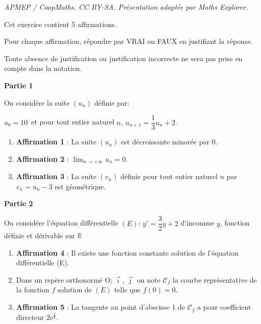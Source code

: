 \documentclass[10pt]{article}
\providecommand{\R}{\mathbb{R}}
\providecommand{\e}{{\mathrm{e}}}
\providecommand{\Oij}{\(\mathrm{O};\vec{\imath},\vec{\jmath}\)}
\begin{document}
\noindent\textit{APMEP / CoopMaths. CC BY-SA. Présentation adaptée par Maths Explorer.}\par\medskip
\medskip

Cet exercice contient 5 affirmations.

Pour chaque affirmation, répondre par VRAI ou FAUX en justifiant la réponse.

Toute absence de justification ou justification incorrecte ne sera pas prise en compte dans la notation.

\medskip

\textbf{Partie 1}

\medskip

On considère la suite $(u_n)$ définie par:

\begin{center}$u_0 = 10$\, et pour tout entier naturel $n,\,u_{n+1} = \dfrac13 u_n + 2$.\end{center}

\medskip

\begin{enumerate}
\item \textbf{Affirmation 1} : La suite $(u_n)$ est décroissante minorée par 0.
\item \textbf{Affirmation 2} : $\displaystyle\lim_{n \to + \infty} u_n = 0$.
\item \textbf{Affirmation 3} : La suite $(v_n)$ définie pour tout entier naturel $n$ par $v_n = u_n - 3$ est géométrique.
\end{enumerate}

\medskip

\textbf{Partie 2}

\medskip

On considère l'équation différentielle $(E) :\, y' = \dfrac32 y + 2$ d'inconnue $y$, fonction définie et 
dérivable sur $\R$

\medskip

\begin{enumerate}
\item \textbf{Affirmation 4} : Il existe une fonction constante solution de l'équation différentielle (E).
\item Dans un repère orthonormé \Oij{} on note $\mathcal{C}_f$ la courbe représentative de la fonction $f$ solution de $(E)$ telle  que $f(0) = 0$.

\item \textbf{Affirmation 5} : La tangente au point d'abscisse 1 de $\mathcal{C}_f$ a pour coefficient directeur $2 \e^{\frac32}$.
\end{enumerate}

\bigskip
\end{document}
